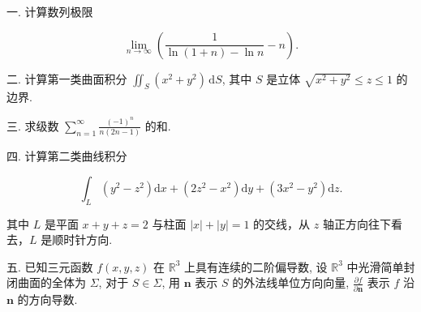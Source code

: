 \documentclass{examcollection}
\renewcommand{\displayformula}[1]{\[#1\]}
\begin{document}
{\begin{minipage}{\textwidth}
\smallskip
一. 计算数列极限\par
\displayformula{\lim _ {n \rightarrow \infty} \left(\frac {1}{\ln (1 + n) - \ln n} - n\right).}\par
二. 计算第一类曲面积分 $\iint_{S} (x^{2} + y^{2}) \, \mathrm{d}S$, 其中 $S$ 是立体 $\sqrt{x^2 + y^2} \leq z \leq 1$ 的边界.\par
三. 求级数 $\sum_{n=1}^{\infty} \frac{(-1)^n}{n(2n-1)}$ 的和.\par
四. 计算第二类曲线积分\par
\displayformula{\int_ {L} \left(y ^ {2} - z ^ {2}\right) \mathrm{d} x + \left(2 z ^ {2} - x ^ {2}\right) \mathrm{d} y + \left(3 x ^ {2} - y ^ {2}\right) \mathrm{d} z.}\par
其中 $L$ 是平面 $x + y + z = 2$ 与柱面 $|x| + |y| = 1$ 的交线，从 $z$ 轴正方向往下看去，$L$ 是顺时针方向.\par
五. 已知三元函数 $f(x, y, z)$ 在 $\mathbb{R}^3$ 上具有连续的二阶偏导数, 设 $\mathbb{R}^3$ 中光滑简单封闭曲面的全体为 $\Sigma$, 对于 $S \in \Sigma$, 用 $\pmb{n}$ 表示 $S$ 的外法线单位方向向量, $\frac{\partial f}{\partial \pmb{n}}$ 表示 $f$ 沿 $\pmb{n}$ 的方向导数.\par
\end{minipage}}
\ifdim\dimexpr\ht\proofbox+\dp\proofbox\relax>\textheight
\noindent\resizebox{!}{\textheight}{\usebox{\proofbox}}\else\noindent\usebox{\proofbox}\fi\clearpage
\end{document}
